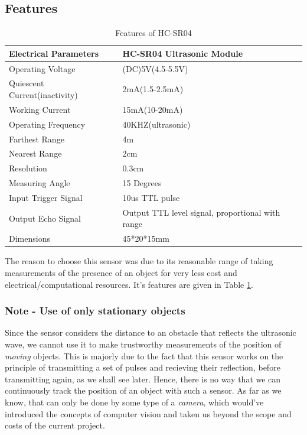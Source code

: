 \subsection{Features}
\begin{table}
	\centering
	\begin{tabular}{|l|l|}
		\hline
		Electrical Parameters &HC-SR04 Ultrasonic Module\\
		\hline
		Operating Voltage &(DC)5V(4.5-5.5V)\\
		\hline
		Quiescent Current(inactivity)  &2mA(1.5-2.5mA)\\
		\hline
		Working Current  &15mA(10-20mA)\\
		\hline
		Operating Frequency &40KHZ(ultrasonic)\\
		\hline
		Farthest Range &4m\\
		\hline
		Nearest Range &2cm\\
		\hline
		Resolution &0.3cm\\
		\hline
		Measuring Angle &15 Degrees\\
		\hline
		Input Trigger Signal &10us TTL pulse\\
		\hline
		Output Echo Signal &Output TTL level signal, proportional
		with range\\
		\hline
		Dimensions &45*20*15mm\\
		\hline

	\end{tabular}
	\caption{Features of HC-SR04}
	\label{tab:FeaturesHCSR}
\end{table}
The reason to choose this sensor was due to its reasonable range of taking measurements of the presence of an object for very less cost and electrical/computational resources. It's features are given in Table \ref{tab:FeaturesHCSR}.
\subsubsection{Note - Use of only stationary objects}
Since the sensor considers the distance to an obstacle that reflects the ultrasonic wave, we cannot use it to make trustworthy measurements of the position of \emph{moving} objects. This is majorly due to the fact that this sensor works on the principle of transmitting a set of pulses and recieving their reflection, before transmitting again, as we shall see later. Hence, there is no way that we can continuously track the position of an object with such a sensor. As far as we know, that can only be done by some type of a \textit{camera}, which would've introduced the concepts of computer vision and taken us beyond the scope and costs of the current project.

